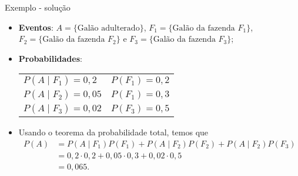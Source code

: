 \documentclass[9pt]{beamer}
\begin{document}
\begin{frame}{Exemplo - solução}
	\begin{itemize}
		\item \textbf{Eventos}: $A=\{\mbox{Galão adulterado}\}$, $F_1 =\{\mbox{Galão da fazenda }F_1\}$, $F_2 =\{\mbox{Galão da fazenda }F_2\}$ e $F_3 =\{\mbox{Galão da fazenda }F_3\}$;
		\item \textbf{Probabilidades}:
		\begin{table}[ht]
			\begin{tabular}{l|l}
				\toprule[0.05cm]
				$P(A \mid F_1) = 0,2$ & $P(F_1) = 0,2$  \\
				$P(A \mid F_2) = 0,05$ & $P(F_1) = 0,3$  \\
				$P(A \mid F_3) = 0,02$ & $P(F_3) = 0,5$  \\
				\bottomrule[0.05cm]
			\end{tabular}
		\end{table}
	\item Usando o teorema da probabilidade total, temos que
	\begin{align*}
	P(A) &= P(A \mid F_1) P(F_1) + P(A \mid F_2) P(F_2) + P(A \mid F_2) P(F_3)\\
	&= 0,2 \cdot 0,2 + 0,05 \cdot  0,3 + 0,02 \cdot 0,5\\
	&= 0,065.
	\end{align*}
	\end{itemize}
\end{frame}

\end{document}
